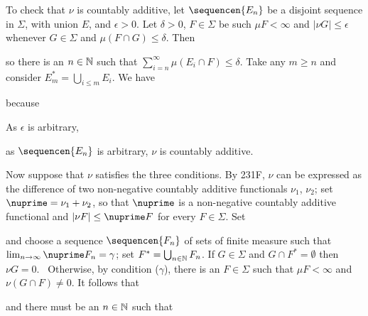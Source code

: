{To check that $\nu$ is countably additive, let $\sequencen{E_n}$ be a
disjoint sequence in $\Sigma$, with union $E$, and $\epsilon>0$.   Let
$\delta>0$, $F\in\Sigma$ be such $\mu F<\infty$ and $|\nu G|\le\epsilon$
whenever $G\in\Sigma$ and $\mu(F\cap G)\le\delta$.   Then


\noindent so there is an $n\in\Bbb N$ such that
$\sum_{i=n}^{\infty}\mu(E_i\cap F)\le\delta$.   Take any $m\ge n$ and
consider $E^*_m=\bigcup_{i\le m}E_i$.   We have




\noindent because


\noindent As $\epsilon$ is arbitrary,


\noindent as $\sequencen{E_n}$ is arbitrary, $\nu$ is countably
additive.

\medskip

 Now suppose that $\nu$ satisfies the three conditions.
By 231F, $\nu$ can be expressed as the difference of two non-negative
countably additive functionals $\nu_1$, $\nu_2$;  set
$\nuprime=\nu_1+\nu_2$, so that $\nuprime$ is a non-negative countably
additive
functional and $|\nu F|\le\nuprime F$ for every $F\in\Sigma$.    Set


\noindent and
choose a sequence $\sequencen{F_n}$ of sets of finite measure such that
$\lim_{n\to\infty}\nuprime F_n=\gamma$;  set $F^*=\bigcup_{n\in\Bbb
N}F_n$.
If $G\in\Sigma$ and $G\cap F^*=\emptyset$ then $\nu G=0$.   \Prf\Quer\
Otherwise, by condition ($\gamma$), there is an $F\in\Sigma$ such that
$\mu F<\infty$ and $\nu(G\cap F)\ne 0$.   It follows that

\Centerline{$\nuprime(F\setminus F^*)\ge\nuprime(F\cap G)\ge|\nu(F\cap
G)|>0$,}

\noindent and there must be an $n\in\Bbb N$ such that


}
